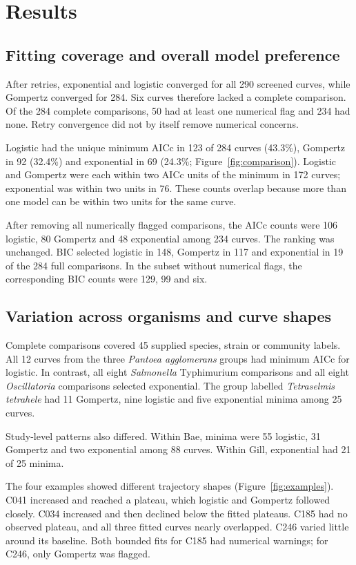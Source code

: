 \documentclass[11pt,a4paper]{article}
\begin{document}
\section{Results}
\subsection{Fitting coverage and overall model preference}
After retries, exponential and logistic converged for all 290 screened curves, while Gompertz converged for 284. Six curves therefore lacked a complete comparison. Of the 284 complete comparisons, 50 had at least one numerical flag and 234 had none. Retry convergence did not by itself remove numerical concerns.

Logistic had the unique minimum AICc in 123 of 284 curves (43.3\%), Gompertz in 92 (32.4\%) and exponential in 69 (24.3\%; Figure~\ref{fig:comparison}). Logistic and Gompertz were each within two AICc units of the minimum in 172 curves; exponential was within two units in 76. These counts overlap because more than one model can be within two units for the same curve.

After removing all numerically flagged comparisons, the AICc counts were 106 logistic, 80 Gompertz and 48 exponential among 234 curves. The ranking was unchanged. BIC selected logistic in 148, Gompertz in 117 and exponential in 19 of the 284 full comparisons. In the subset without numerical flags, the corresponding BIC counts were 129, 99 and six.

\subsection{Variation across organisms and curve shapes}
Complete comparisons covered 45 supplied species, strain or community labels. All 12 curves from the three \textit{Pantoea agglomerans} groups had minimum AICc for logistic. In contrast, all eight \textit{Salmonella} Typhimurium comparisons and all eight \textit{Oscillatoria} comparisons selected exponential. The group labelled \textit{Tetraselmis tetrahele} had 11 Gompertz, nine logistic and five exponential minima among 25 curves.

Study-level patterns also differed. Within Bae, minima were 55 logistic, 31 Gompertz and two exponential among 88 curves. Within Gill, exponential had 21 of 25 minima.

The four examples showed different trajectory shapes (Figure~\ref{fig:examples}). C041 increased and reached a plateau, which logistic and Gompertz followed closely. C034 increased and then declined below the fitted plateaus. C185 had no observed plateau, and all three fitted curves nearly overlapped. C246 varied little around its baseline. Both bounded fits for C185 had numerical warnings; for C246, only Gompertz was flagged.
\end{document}
